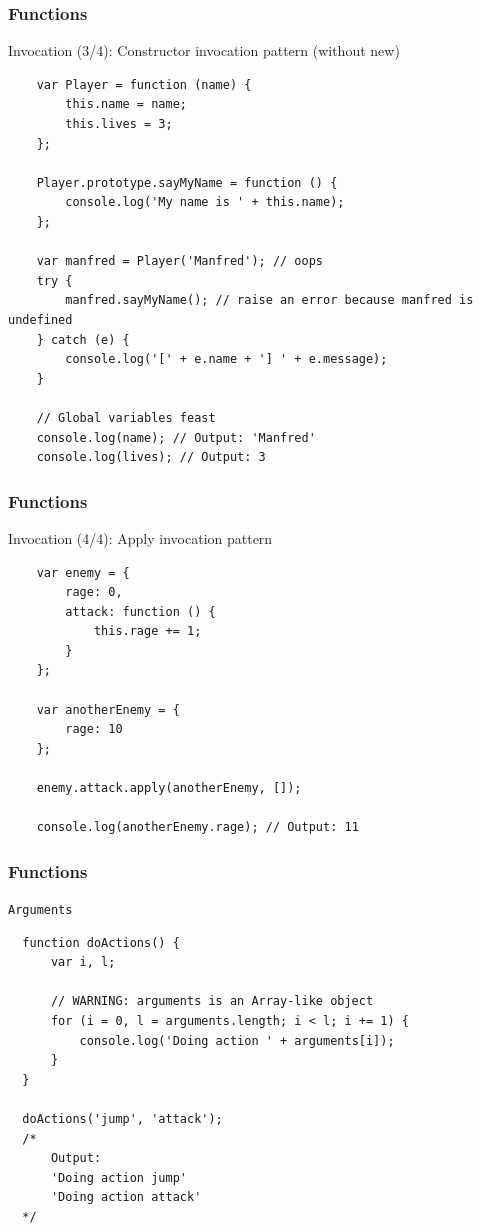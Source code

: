 \begin{frame}[fragile]
  \frametitle{Functions}

  \begin{block}{Invocation (3/4): Constructor invocation pattern (without new)}
    {\scriptsize
    \begin{verbatim}
    var Player = function (name) {
        this.name = name;
        this.lives = 3;
    };

    Player.prototype.sayMyName = function () {
        console.log('My name is ' + this.name);
    };

    var manfred = Player('Manfred'); // oops
    try {
        manfred.sayMyName(); // raise an error because manfred is undefined
    } catch (e) {
        console.log('[' + e.name + '] ' + e.message);
    }
    
    // Global variables feast
    console.log(name); // Output: 'Manfred'
    console.log(lives); // Output: 3
    \end{verbatim}
    }
  \end{block}
\end{frame}

\begin{frame}[fragile]
  \frametitle{Functions}

  \begin{block}{Invocation (4/4): Apply invocation pattern}
    {\scriptsize
    \begin{verbatim}
    var enemy = {
        rage: 0,
        attack: function () {
            this.rage += 1;
        }
    };

    var anotherEnemy = {
        rage: 10
    };

    enemy.attack.apply(anotherEnemy, []);

    console.log(anotherEnemy.rage); // Output: 11
    \end{verbatim}
    }
  \end{block}
\end{frame}

\begin{frame}[fragile]
  \frametitle{Functions}

  \begin{block}{\texttt{Arguments}}
  {\scriptsize
  \begin{verbatim}
  function doActions() {
      var i, l;

      // WARNING: arguments is an Array-like object
      for (i = 0, l = arguments.length; i < l; i += 1) {
          console.log('Doing action ' + arguments[i]);
      }
  }

  doActions('jump', 'attack');
  /*
      Output:
      'Doing action jump'
      'Doing action attack'
  */
  \end{verbatim}
  }
  \end{block}
\end{frame}

